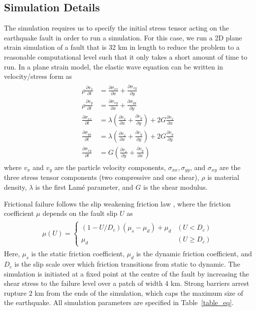 \documentclass[openacc]{rstransa}%
\begin{document}
\subsection{Simulation Details}

The simulation requires us to specify the initial stress tensor acting on the earthquake fault in order to run a
simulation. For this case, we run a 2D plane strain simulation of a fault that is 32 km in length
to reduce the problem to a reasonable
computational level such that it only takes a short amount of time to run. In a plane strain model, the
elastic wave equation can be written in velocity/stress form as
\begin{align}\label{elasticwave}
\begin{split}
\rho\frac{\partial v_x}{\partial t} &= \frac{\partial \sigma_{xx}}{\partial x} + \frac{\partial \sigma_{xy}}{\partial y}\\
\rho\frac{\partial v_y}{\partial t} &= \frac{\partial \sigma_{xy}}{\partial x} + \frac{\partial \sigma_{yy}}{\partial y}\\
\frac{\partial \sigma_{xx}}{\partial t} &= \lambda\left(\frac{\partial v_x}{\partial x} + \frac{\partial v_y}{\partial y}\right) + 2G \frac{\partial v_x}{\partial x}\\
\frac{\partial \sigma_{yy}}{\partial t} &= \lambda\left(\frac{\partial v_x}{\partial x} + \frac{\partial v_y}{\partial y}\right) + 2G \frac{\partial v_y}{\partial y}\\
\frac{\partial \sigma_{xy}}{\partial t} &= G \left(\frac{\partial v_x}{\partial y} + \frac{\partial v_y}{\partial x} \right)
\end{split}
\end{align}
where $v_x$ and $v_y$ are the particle velocity components, $\sigma_{xx}, \sigma_{yy}$, and $\sigma_{xy}$
are the three stress tensor components (two compressive and one shear), $\rho$ is material
density, $\lambda$ is the first Lam\'{e} parameter, and $G$ is the shear modulus.

Frictional failure follows the slip weakening friction law \cite{slipweak}, where the friction coefficient $\mu$ depends
on the fault slip $U$ as
\begin{align}\label{slipweak}
\begin{split}
\mu(U) = \begin{cases}(1 - U/D_c)(\mu_s-\mu_d) + \mu_d & (U < D_c) \\ \mu_d & (U \geq D_c) \end{cases}
\end{split}
\end{align}
Here, $\mu_s$ is the static friction coefficient, $\mu_d$ is the dynamic friction coefficient, and $D_c$
is the slip scale over which friction transitions from static to dynamic. The simulation is initiated
at a fixed point at the centre of the fault by increasing the shear stress to the failure level over
a patch of width 4 km. Strong barriers arrest rupture 2 km from the ends of the simulation, which
caps the maximum size of the earthquake. All simulation parameters
are specified in Table~\ref{table_eq}.
\end{document}
